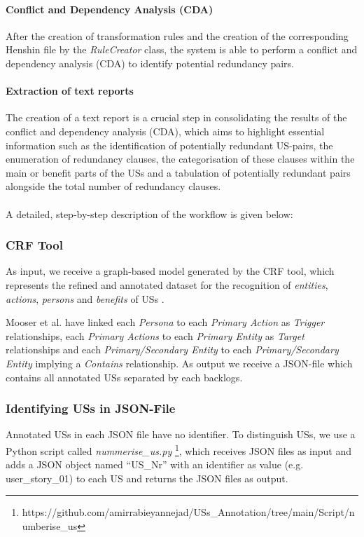 \paragraph{Conflict and Dependency Analysis (CDA)} After the creation of transformation rules and the creation of the corresponding Henshin file by the \textit{RuleCreator} class, the system is able to perform a conflict and dependency analysis (CDA) to identify potential redundancy pairs.

\paragraph{Extraction of text reports} The creation of a text report is a crucial step in consolidating the results of the conflict and dependency analysis (CDA), which aims to highlight essential information such as the identification of potentially redundant US-pairs, the enumeration of redundancy clauses, the categorisation of these clauses within the main or benefit parts of the USs and a tabulation of potentially redundant pairs alongside the total number of redundancy clauses.\\\\
A detailed, step-by-step description of the workflow is given below:
\subsubsection*{CRF Tool}\label{workflow_crf}
As input, we receive a graph-based model generated by the CRF tool, which represents the refined and annotated dataset for the recognition of \emph{entities}, \emph{actions}, \emph{persons} and \emph{benefits} of USs \cite{mosser2022modelling}.

Mooser et al. have linked each \emph{Persona} to each \emph{Primary Action} as \emph{Trigger} relationships, each \emph{Primary Actions} to each \emph{Primary Entity} as \emph{Target} relationships and each \emph{Primary/Secondary Entity} to each \emph{Primary/Secondary Entity} implying a \emph{Contains} relationship\cite{arulmohan2023extracting}. As output we receive a JSON-file which contains all annotated USs separated by each backlogs.
\subsubsection*{Identifying USs in JSON-File}\label{workflow_nummerize_us}
Annotated USs in each JSON file have no identifier. To distinguish USs, we use a Python script called \textit{nummerise\_us.py} \footnote{https://github.com/amirrabieyannejad/USs\_Annotation/tree/main/Script/numberise\_us}, which receives JSON files as input and adds a JSON object named \enquote{US\_Nr} with an identifier as value (e.g. user\_story\_01) to each US and returns the JSON files as output.
